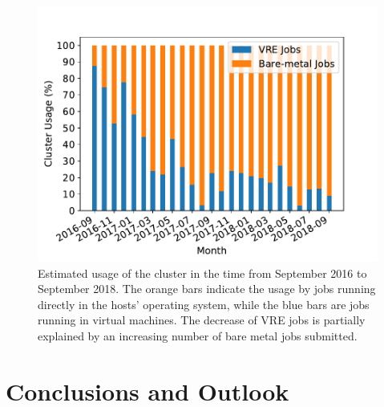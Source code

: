 

\begin{figure}
\begin{center}
  \includegraphics[width=\linewidth]{figures/NodeUsage_2016-09_2018-09.pdf}
  \caption{Estimated usage of the \NEMO cluster in the time from September 2016
    to September 2018. The orange bars indicate the usage by jobs
    running directly in the hosts' operating system, while the blue bars are jobs
    running in virtual machines. The decrease of VRE jobs is partially explained
    by an increasing number of bare metal jobs submitted.}
  \label{fig-nodeusage}
\end{center}
\end{figure}

\section{Conclusions and Outlook}


